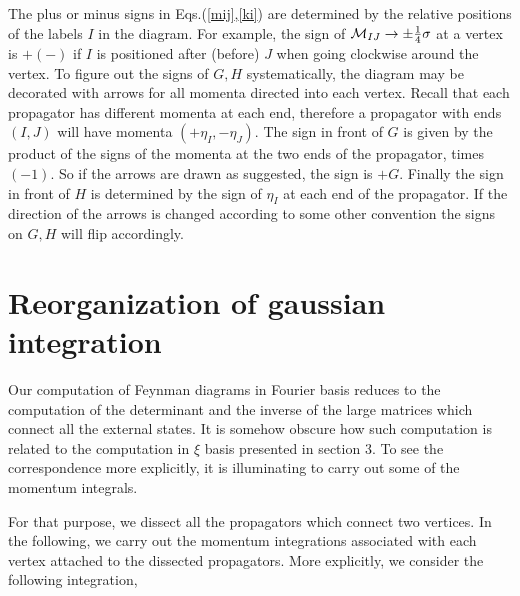 \documentclass[a4paper,11pt]{article}
\begin{document}
The plus or minus signs in Eqs.(\ref{mij},\ref{ki}) are determined
by the relative positions of the labels $I$ in the diagram. For
example, the sign of $\mathcal{M}_{IJ}\rightarrow \pm {1\over
4}\sigma$ at a vertex is $+(-)$ if $I$ is positioned after 
(before) $J$ when going clockwise around the vertex.
To figure out the signs of $G,H$ systematically, the diagram may 
be decorated with arrows for all momenta directed into each 
vertex. Recall that each propagator has different momenta at each 
end, therefore a propagator with ends $(I,J)$ will have momenta 
$(+\eta_I,-\eta_J)$. The sign in front of $G$ is given by the 
product of the signs of the momenta at the two ends of the 
propagator, times $(-1)$. So if the arrows are drawn as suggested, 
the sign is $+G$. Finally the sign in front of $H$ is determined by 
the sign of $\eta_I$ at each end of the propagator. If the 
direction of the arrows is changed according to some other 
convention the signs on $G,H$ will flip accordingly.



\section{Reorganization of gaussian integration}


Our computation of Feynman diagrams in Fourier basis reduces to the
computation of the determinant and the inverse of the large matrices which
connect all the external states. It is somehow obscure how such computation
is related to the computation in $\xi$ basis presented in section 3. To see
the correspondence more explicitly, it is illuminating to carry out some of
the momentum integrals.

For that purpose, we dissect all the propagators which connect two vertices.
In the following, we carry out the momentum integrations associated with
each vertex attached to the dissected propagators. More explicitly, we
consider the following integration,
\end{document}
